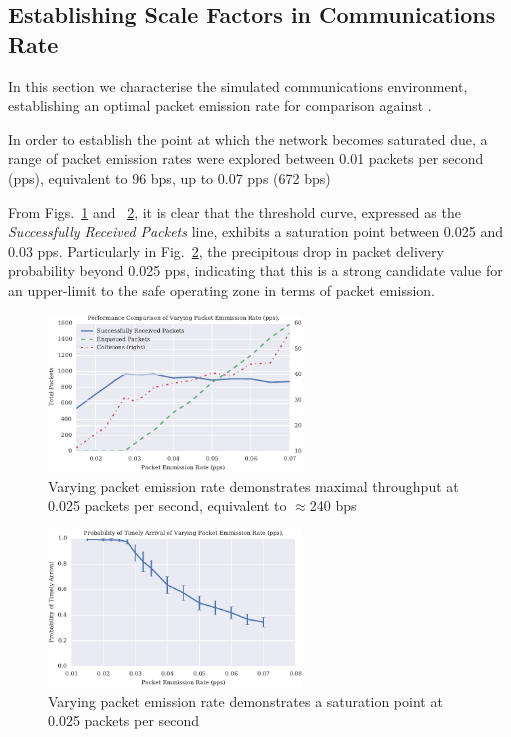 \documentclass[runningheads,a4paper]{llncs}
\begin{document}
\subsection{Establishing Scale Factors in Communications Rate}

In this section we characterise the simulated communications environment, establishing an optimal packet emission rate for comparison against \cite{Guo11}.

In order to establish the point at which the network becomes saturated due, a range of packet emission rates were explored between 0.01 packets per second (pps), equivalent to 96 bps, up to 0.07 pps (672 bps)

From Figs.~\ref{fig:throughput_performance_static} and ~\ref{fig:prod_breakdown_static}, it is clear that the threshold curve, expressed as the \emph{Successfully Received Packets} line, exhibits a saturation point between 0.025 and 0.03 pps.
Particularly in Fig.~\ref{fig:prod_breakdown_static}, the precipitous drop in packet delivery probability beyond 0.025 pps, indicating that this is a strong candidate value for an upper-limit to the safe operating zone in terms of packet emission.

\begin{figure}[H]
  \centering
  \includegraphics[width=0.6\textwidth]{img/throughput_performance_static.pdf}
  \caption{Varying packet emission rate demonstrates maximal throughput at 0.025 packets per second, equivalent to $\approx$240 bps}
  \label{fig:throughput_performance_static}
\end{figure}


\begin{figure}[H]
  \centering
  \includegraphics[width=0.6\textwidth]{img/prod_breakdown_static.pdf}
  \caption{Varying packet emission rate demonstrates a saturation point at 0.025 packets per second}
  \label{fig:prod_breakdown_static}
\end{figure}
\end{document}
